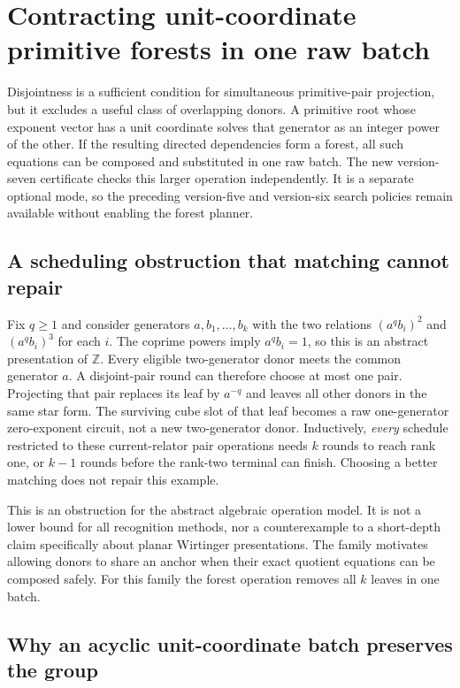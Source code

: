 \section{Contracting unit-coordinate primitive forests in one raw batch}
\label{sec:primitive-forests}

Disjointness is a sufficient condition for simultaneous primitive-pair
projection, but it excludes a useful class of overlapping donors. A
primitive root whose exponent vector has a unit coordinate solves that
generator as an integer power of the other. If the resulting directed
dependencies form a forest, all such equations can be composed and
substituted in one raw batch. The new version-seven certificate checks
this larger operation independently. It is a separate optional mode,
so the preceding version-five and version-six search policies remain
available without enabling the forest planner.

\subsection{A scheduling obstruction that matching cannot repair}

Fix $q\ge1$ and consider generators $a,b_1,\ldots,b_k$ with the two
relations $(a^q b_i)^2$ and $(a^q b_i)^3$ for each $i$. The coprime powers
imply $a^q b_i=1$, so this is an abstract presentation of $\mathbb Z$.
Every eligible two-generator donor meets the common generator $a$.
A disjoint-pair round can therefore choose at most one pair. Projecting
that pair replaces its leaf by $a^{-q}$ and leaves all other donors in
the same star form. The surviving cube slot of that leaf becomes a raw
one-generator zero-exponent circuit, not a new two-generator donor.
Inductively, \emph{every} schedule restricted to these current-relator
pair operations needs $k$ rounds to reach rank one, or $k-1$ rounds
before the rank-two terminal can finish. Choosing a better matching does
not repair this example.

This is an obstruction for the abstract algebraic operation model. It is
not a lower bound for all recognition methods, nor a counterexample to a
short-depth claim specifically about planar Wirtinger presentations.
The family motivates allowing donors to share an anchor when their exact
quotient equations can be composed safely. For this family the forest
operation removes all $k$ leaves in one batch.

\subsection{Why an acyclic unit-coordinate batch preserves the group}

